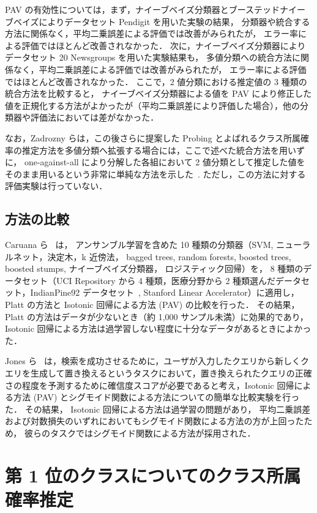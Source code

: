 \documentclass[japanese]{jnlp_1.4}
\begin{document}
PAV の有効性については，まず，ナイーブベイズ分類器とブーステッドナイーブベイズによりデータセット Pendigit を用いた実験の結果，
分類器や統合する方法に関係なく，平均二乗誤差による評価では改善がみられたが，
エラー率による評価ではほとんど改善されなかった．
次に，ナイーブベイズ分類器によりデータセット 20 Newsgroups を用いた実験結果も，
多値分類への統合方法に関係なく，平均二乗誤差による評価では改善がみられたが，
エラー率による評価ではほとんど改善されなかった．
ここで，2 値分類における推定値の 3 種類の統合方法を比較すると，
ナイーブベイズ分類器による値を PAV により修正した値を正規化する方法がよかったが（平均二乗誤差により評価した場合），他の分類器や評価法においては差がなかった．

なお，Zadrozny らは，この後さらに提案した Probing とよばれるクラス所属確率の推定方法を多値分類へ拡張する場合には，ここで述べた統合方法を用いずに，
one-against-all により分解した各組において 2 値分類として推定した値をそのまま用いるという非常に単純な方法を示した~\cite{Zadrozny05}. 
ただし，この方法に対する評価実験は行っていない．

\subsection{方法の比較}

Caruana ら~\cite{Caruana04,Mizil05} は，
アンサンブル学習を含めた 10 種類の分類器（SVM, ニューラルネット，決定木，k 近傍法，
bagged trees, random forests, boosted trees, boosted stumps,  ナイーブベイズ分類器，
ロジスティック回帰）を，
8 種類のデータセット（UCI Repository から 4 種類，医療分野から 2 種類選んだデータセット，IndianPine92 データセット~\cite{Gualtieri99}, Stanford Linear Accelerator）に適用し，
Platt の方法と Isotonic 回帰による方法 (PAV) の比較を行った．
その結果，
Platt の方法はデータが少ないとき（約 1,000 サンプル未満）に効果的であり，
Isotonic 回帰による方法は過学習しない程度に十分なデータがあるときによかった．

Jones ら~\cite{Jones06} は，検索を成功させるために，ユーザが入力したクエリから新しくクエリを生成して置き換えるというタスクにおいて，置き換えられたクエリの正確さの程度を予測するために確信度スコアが必要であると考え，Isotonic 回帰による方法 (PAV) とシグモイド関数による方法についての簡単な比較実験を行った． 
その結果，
Isotonic 回帰による方法は過学習の問題があり，
平均二乗誤差および対数損失のいずれにおいてもシグモイド関数による方法の方が上回ったため，
彼らのタスクではシグモイド関数による方法が採用された．

\section{第 1 位のクラスについてのクラス所属確率推定}
\end{document}
